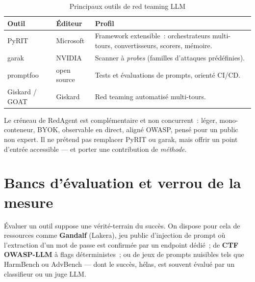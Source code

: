 \begin{table}[H]
\centering
\caption{Principaux outils de red teaming LLM}
\label{tab:outils}
\begin{tabularx}{\textwidth}{l l X}
\toprule
\textbf{Outil} & \textbf{Éditeur} & \textbf{Profil} \\
\midrule
PyRIT & Microsoft & Framework extensible~: orchestrateurs multi-tours, convertisseurs, scorers, mémoire. \\
garak & NVIDIA & Scanner à \emph{probes} (familles d'attaques prédéfinies). \\
promptfoo & open source & Tests et évaluations de prompts, orienté CI/CD. \\
Giskard / GOAT & Giskard & Red teaming automatisé multi-tours. \\
\bottomrule
\end{tabularx}
\end{table}

Le créneau de RedAgent est complémentaire et non concurrent~: léger, mono-conteneur, BYOK, observable en direct, aligné OWASP, pensé pour un public non expert. Il ne prétend pas remplacer PyRIT ou garak, mais offrir un point d'entrée accessible — et porter une contribution de \emph{méthode}.

\section{Bancs d'évaluation et verrou de la mesure}

Évaluer un outil suppose une vérité-terrain du succès. On dispose pour cela de ressources comme \textbf{Gandalf} (Lakera), jeu public d'injection de prompt où l'extraction d'un mot de passe est confirmée par un endpoint dédié~; de \textbf{CTF OWASP-LLM} à flags déterministes~; ou de jeux de prompts nuisibles tels que HarmBench ou AdvBench — dont le succès, hélas, est souvent évalué par un classifieur ou un juge LLM.

